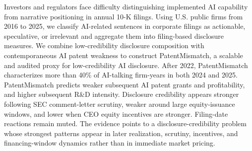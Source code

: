 Investors and regulators face difficulty distinguishing implemented AI capability from narrative positioning in annual 10-K filings. Using U.S. public firms from 2016 to 2025, we classify AI-related sentences in corporate filings as actionable, speculative, or irrelevant and aggregate them into filing-based disclosure measures. We combine low-credibility disclosure composition with contemporaneous AI patent weakness to construct PatentMismatch, a scalable and audited proxy for low-credibility AI disclosure. After 2022, PatentMismatch characterizes more than 40\% of AI-talking firm-years in both 2024 and 2025. PatentMismatch predicts weaker subsequent AI patent grants and profitability, and higher subsequent R\&D intensity. Disclosure credibility appears stronger following SEC comment-letter scrutiny, weaker around large equity-issuance windows, and lower when CEO equity incentives are stronger. Filing-date reactions remain muted. The evidence points to a disclosure-credibility problem whose strongest patterns appear in later realization, scrutiny, incentives, and financing-window dynamics rather than in immediate market pricing.